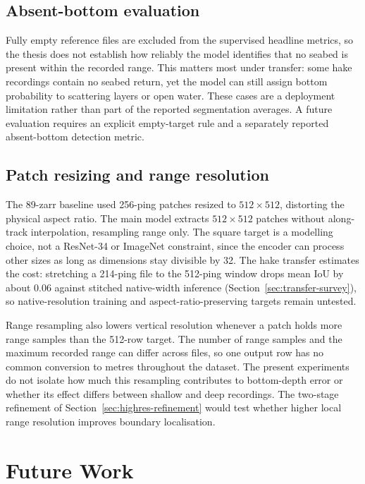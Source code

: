 \subsection{Absent-bottom evaluation}
Fully empty reference files are excluded from the supervised headline metrics, so the thesis does not establish how reliably the model identifies that no seabed is present within the recorded range. This matters most under transfer: some hake recordings contain no seabed return, yet the model can still assign bottom probability to scattering layers or open water. These cases are a deployment limitation rather than part of the reported segmentation averages. A future evaluation requires an explicit empty-target rule and a separately reported absent-bottom detection metric.

\subsection{Patch resizing and range resolution}
The 89-zarr baseline used 256-ping patches resized to $512\times512$, distorting the physical aspect ratio. The main model extracts $512 \times 512$ patches without along-track interpolation, resampling range only. The square target is a modelling choice, not a ResNet-34 or ImageNet constraint, since the encoder can process other sizes as long as dimensions stay divisible by 32. The hake transfer estimates the cost: stretching a 214-ping file to the 512-ping window drops mean IoU by about 0.06 against stitched native-width inference (Section~\ref{sec:transfer-survey}), so native-resolution training and aspect-ratio-preserving targets remain untested.

Range resampling also lowers vertical resolution whenever a patch holds more range samples than the 512-row target. The number of range samples and the maximum recorded range can differ across files, so one output row has no common conversion to metres throughout the dataset. The present experiments do not isolate how much this resampling contributes to bottom-depth error or whether its effect differs between shallow and deep recordings. The two-stage refinement of Section~\ref{sec:highres-refinement} would test whether higher local range resolution improves boundary localisation.

\section{Future Work}

